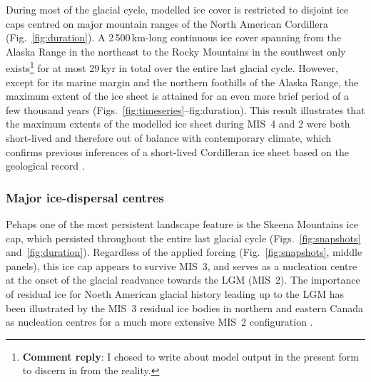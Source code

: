 \documentclass[tc, manuscript]{copernicus}
\newcommand{\renote}[1]{\footnote{\textbf{Comment reply}: #1}}
\begin{document}
During most of the glacial cycle, modelled ice cover is restricted to disjoint
ice caps centred on major mountain ranges of the North American Cordillera
(Fig.~\ref{fig:duration}). A 2\,500\,km-long continuous ice cover spanning from
the Alaska Range in the northeast to the Rocky Mountains in the southwest only
exists\renote{
    I chosed to write about model output in the present form to discern in from
    the reality.}
for at most 29\,kyr in total over the entire last glacial cycle. However,
except for its marine margin and the northern foothills of the Alaska Range,
the maximum extent of the ice sheet is attained for an even more brief period
of a few thousand years (Figs.~\ref{fig:timeseries}--{fig:duration}). This
result illustrates that the maximum extents of the modelled ice sheet during
MIS~4 and 2 were both short-lived and therefore out of balance with
contemporary climate, which confirms previous inferences of a short-lived
Cordilleran ice sheet based on the geological record \citep{Clague.etal.1980,
Stroeven.etal.2010}.

\subsubsection{Major ice-dispersal centres}

Pehaps one of the most persistent landscape feature is the Skeena Mountains ice
cap, which persisted throughout the entire last glacial cycle
(Figs.~\ref{fig:snapshots} and~\ref{fig:duration}). Regardless of the applied
forcing (Fig.~\ref{fig:snapshots}, middle panels), this ice cap appears to
survive MIS~3, and serves as a nucleation centre at the onset of the glacial
readvance towards the LGM (MIS~2). The importance of residual ice for Noeth
American glacial history leading up to the LGM has been illustrated by the
MIS~3 residual ice bodies in northern and eastern Canada as nucleation centres
for a much more extensive MIS~2 configuration \citep{Kleman.etal.2010}.
\end{document}
